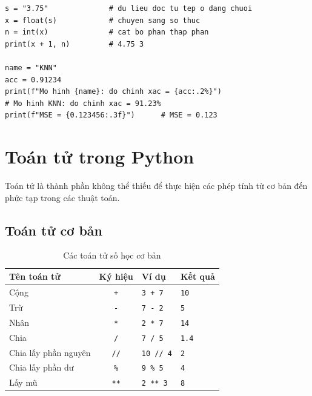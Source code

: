 \begin{lstlisting}[caption={Chuyển đổi kiểu và f-string}]
s = "3.75"              # du lieu doc tu tep o dang chuoi
x = float(s)            # chuyen sang so thuc
n = int(x)              # cat bo phan thap phan
print(x + 1, n)         # 4.75 3

name = "KNN"
acc = 0.91234
print(f"Mo hinh {name}: do chinh xac = {acc:.2%}")
# Mo hinh KNN: do chinh xac = 91.23%
print(f"MSE = {0.123456:.3f}")      # MSE = 0.123
\end{lstlisting}

\section{Toán tử trong Python}

Toán tử là thành phần không thể thiếu để thực hiện các phép tính từ cơ bản đến phức tạp trong các thuật toán.

\subsection{Toán tử cơ bản}
\begin{table}[H]
\centering
\begin{tabular}{|l|c|l|l|}
\hline
\textbf{Tên toán tử} & \textbf{Ký hiệu} & \textbf{Ví dụ} & \textbf{Kết quả} \\
\hline
Cộng & \texttt{+} & \texttt{3 + 7} & \texttt{10} \\
\hline
Trừ & \texttt{-} & \texttt{7 - 2} & \texttt{5} \\
\hline
Nhân & \texttt{*} & \texttt{2 * 7} & \texttt{14} \\
\hline
Chia & \texttt{/} & \texttt{7 / 5} & \texttt{1.4} \\
\hline
Chia lấy phần nguyên & \texttt{//} & \texttt{10 // 4} & \texttt{2} \\
\hline
Chia lấy phần dư & \texttt{\%} & \texttt{9 \% 5} & \texttt{4} \\
\hline
Lấy mũ & \texttt{**} & \texttt{2 ** 3} & \texttt{8} \\
\hline
\end{tabular}
\caption{Các toán tử số học cơ bản}
\end{table}

